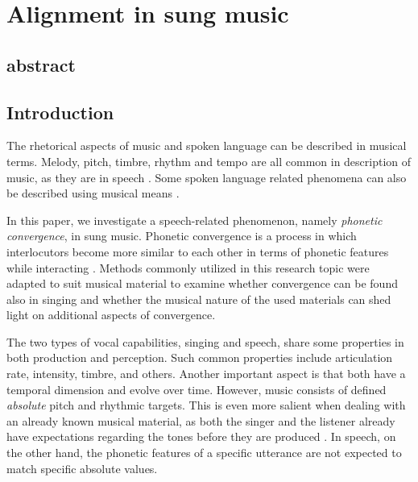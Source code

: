 \chapter{Alignment in sung music}
\label{chap:alignment_in_sung_music}



\section{abstract}
\label{sec:abstract}

\section{Introduction}
\label{sec:introduction}

The rhetorical aspects of music and spoken language can be described in musical terms.
Melody, pitch, timbre, rhythm and tempo are all common in description of music, as they are in speech \citep{Molino2000toward, Jackendoff2009parallels}.
Some spoken language related phenomena can also be described using musical means \citep[as in][]{Day2013speech}.

In this paper, we investigate a speech-related phenomenon, namely \emph{phonetic convergence}, in sung music.
Phonetic convergence is a process in which interlocutors become more similar to each other in terms of phonetic features while interacting \citep{Pardo2006phonetic, Kim2011phonetic}.
Methods commonly utilized in this research topic were adapted to suit musical material to examine whether convergence can be found also in singing and whether the musical nature of the used materials can shed light on additional aspects of convergence.

The two types of vocal capabilities, singing and speech, share some properties in both production and perception.
Such common properties include articulation rate, intensity, timbre, and others.
Another important aspect is that both have a temporal dimension and evolve over time.
However, music consists of defined \emph{absolute} pitch and rhythmic targets.
This is even more salient when dealing with an already known musical material, as both the singer and the listener already have expectations regarding the tones before they are produced \citep{Meyer2008emotion}.
In speech, on the other hand, the phonetic features of a specific utterance are not expected to match specific absolute values.

